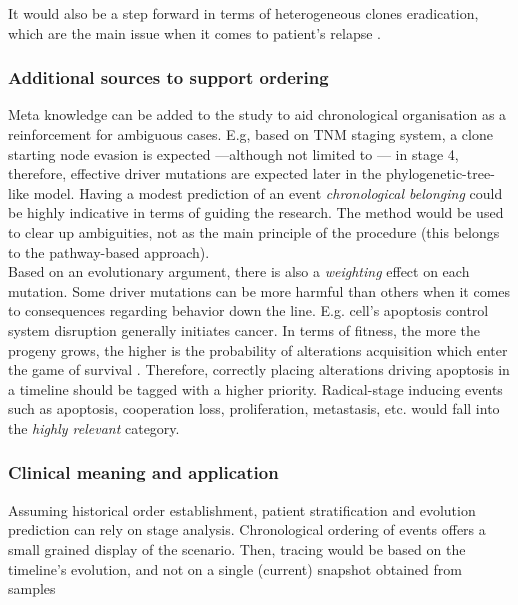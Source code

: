 It would also be a step forward in terms of heterogeneous clones eradication, which are the main issue when it comes to patient's relapse  \cite{Turajlic2016MetastasisProcess}.

\subsubsection{Additional sources to support ordering}
Meta knowledge can be added to the study to aid chronological organisation as a reinforcement for ambiguous cases. E.g, based on TNM staging system, a clone starting node evasion is expected —although not limited to \cite{Turajlic2016MetastasisProcess}— in stage 4, therefore, effective driver mutations are expected later in the phylogenetic-tree-like model. Having a modest prediction of an event \textit{chronological belonging} could be highly indicative in terms of guiding the research. The method would be used to clear up ambiguities, not as the main principle of the procedure (this belongs to the pathway-based approach).
\\

Based on an evolutionary argument, there is also a \emph{weighting} effect on each mutation. Some driver mutations can be more harmful than others when it comes to consequences regarding behavior down the line. E.g. cell's apoptosis control system disruption generally initiates cancer. In terms of fitness, the more the progeny grows, the higher is the probability of alterations acquisition which enter the game of survival \cite{Gerstung2011TheTumorigenesis}. Therefore, correctly placing alterations driving apoptosis in a timeline should be tagged with a higher priority. Radical-stage inducing events such as apoptosis, cooperation loss, proliferation, metastasis, etc. would fall into the \textit{highly relevant} category.
\\

\subsubsection{Clinical meaning and application}
Assuming historical order establishment, patient stratification and evolution prediction can rely on stage analysis. Chronological ordering of events offers a small grained display of the scenario. Then, tracing would be based on the timeline's evolution, and not on a single (current) snapshot obtained from samples 
\\

